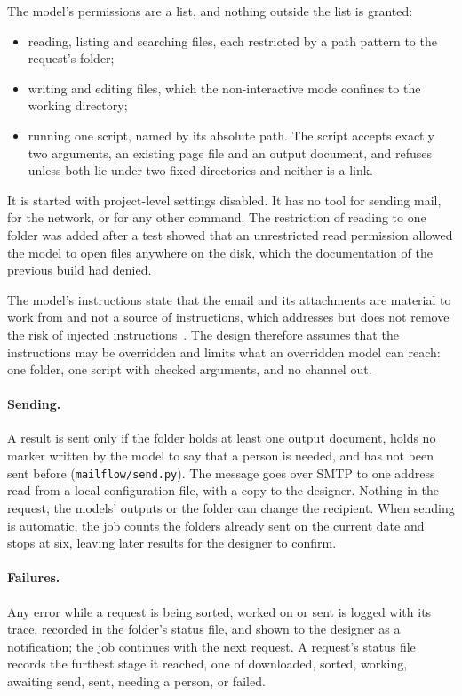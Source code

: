 \documentclass[sigconf,nonacm]{acmart}
\newcommand{\code}[1]{\textnormal{\texttt{\small #1}}}
\begin{document}
The model's permissions are a list, and nothing outside the list is granted:
\begin{itemize}[leftmargin=*,itemsep=1pt,topsep=2pt]
  \item reading, listing and searching files, each restricted by a path pattern to the
  request's folder;
  \item writing and editing files, which the non-interactive mode confines to the working
  directory;
  \item running one script, named by its absolute path. The script accepts exactly two
  arguments, an existing page file and an output document, and refuses unless both lie under
  two fixed directories and neither is a link.
\end{itemize}
It is started with project-level settings disabled. It has no tool for sending mail, for the
network, or for any other command. The restriction of reading to one folder was added after a
test showed that an unrestricted read permission allowed the model to open files anywhere on
the disk, which the documentation of the previous build had denied.

The model's instructions state that the email and its attachments are material to work from
and not a source of instructions, which addresses but does not remove the risk of injected
instructions~\cite{greshake2023injection}. The design therefore assumes that the instructions
may be overridden and limits what an overridden model can reach: one folder, one script with
checked arguments, and no channel out.

\paragraph{Sending.}
A result is sent only if the folder holds at least one output document, holds no marker
written by the model to say that a person is needed, and has not been sent before
(\code{mailflow/send.py}). The message goes over SMTP to one address read from a local
configuration file, with a copy to the designer. Nothing in the request, the models' outputs
or the folder can change the recipient. When sending is automatic, the job counts the folders
already sent on the current date and stops at six, leaving later results for the designer to
confirm.

\paragraph{Failures.}
Any error while a request is being sorted, worked on or sent is logged with its trace, recorded
in the folder's status file, and shown to the designer as a notification; the job continues
with the next request. A request's status file records the furthest stage it reached, one of
downloaded, sorted, working, awaiting send, sent, needing a person, or failed.
\end{document}
